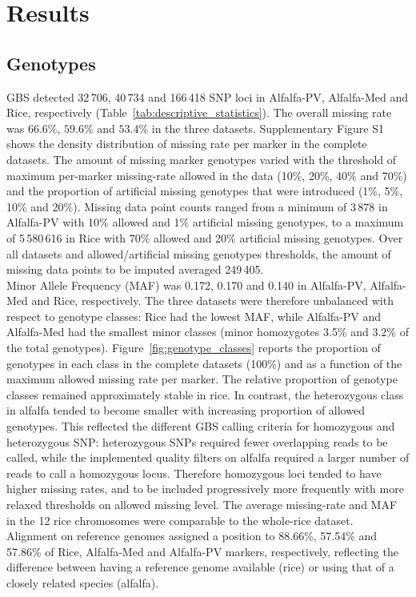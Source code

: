  
\makeatletter{}\section{Results}
\label{sec:results}

\subsection{Genotypes}
\label{sec:genotypes}  
GBS detected 32\,706, 40\,734 and 166\,418 SNP loci in Alfalfa-PV, Alfalfa-Med and Rice, respectively (Table~\ref{tab:descriptive_statistics}). The overall missing rate was $66.6\%$, $59.6\%$ and $53.4\%$ in the three datasets. Supplementary Figure S1 shows the density distribution of missing rate per marker in the complete datasets. The amount of missing marker genotypes varied with the threshold of maximum per-marker missing-rate allowed in the data (10\%, 20\%, 40\% and 70\%) and the proportion of artificial missing genotypes that were introduced (1\%, 5\%, 10\% and 20\%). Missing data point counts ranged from a minimum of 3\,878 in Alfalfa-PV with 10\% allowed and 1\% artificial missing genotypes, to a maximum of 5\,580\,616 in Rice with 70\% allowed and 20\% artificial missing genotypes. Over all datasets and allowed/artificial missing genotypes thresholds, the amount of missing data points to be imputed averaged 249\,405.\\
Minor Allele Frequency (MAF) was 0.172, 0.170 and 0.140 in Alfalfa-PV, Alfalfa-Med and Rice, respectively. The three datasets were therefore unbalanced with respect to genotype classes: Rice had the lowest MAF, while Alfalfa-PV and Alfalfa-Med had the smallest minor classes (minor homozygotes 3.5\% and 3.2\% of the total genotypes). Figure~\ref{fig:genotype_classes} reports the proportion of genotypes in each class in the complete datasets (100\%) and as a function of the maximum allowed missing rate per marker. The relative proportion of genotype classes remained approximately stable in rice. In contrast, the heterozygous class in alfalfa tended to become smaller with increasing proportion of allowed genotypes. This reflected the different GBS calling criteria for homozygous and heterozygous SNP: heterozygous SNPs required fewer overlapping reads to be called, while the implemented quality filters on alfalfa required a larger number of reads to call a homozygous locus. Therefore homozygous loci tended to have higher missing rates, and to
be included progressively more frequently with more relaxed thresholds on allowed missing level.
The average missing-rate and MAF in the 12 rice chromosomes were comparable to the whole-rice dataset.\\
Alignment on reference genomes assigned a position to 88.66\%, 57.54\% and 57.86\% of Rice, Alfalfa-Med and Alfalfa-PV markers, respectively, reflecting the difference between having a reference genome available (rice) or using that of a closely related species (alfalfa).

